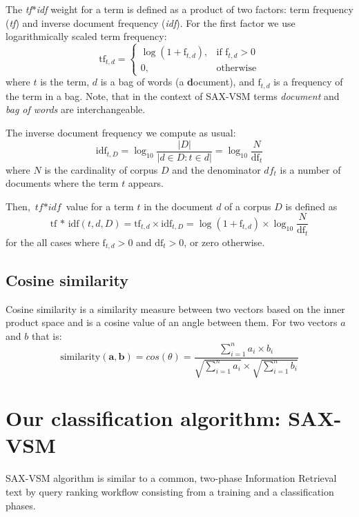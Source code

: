 \documentclass{llncs}
\begin{document}
The \textit{tf$\ast$idf} weight for a term is defined as a product of two factors: 
term frequency (\textit{tf}) and inverse document frequency (\textit{idf}). 
For the first factor we use logarithmically scaled term frequency:
\begin{equation}
 \mbox{tf}_{t, d} =  \begin{cases} \log(1 + \mbox{f}_{t,d}), &\mbox{if f}_{t,d}>0  \\
0, & \mbox{otherwise} \end{cases}
\end{equation} 
where $t$ is the term, $d$ is a bag of words (a \textbf{d}ocument), and $\mbox{f}_{t,d}$ 
is a frequency of the term in a bag. Note, that in the context of SAX-VSM terms 
\textit{document} and \textit{bag of words} are interchangeable.

The inverse document frequency we compute as usual:
\begin{equation}
 \mbox{idf}_{t, D} =  \log_{10}\frac{|D|}{|d \in D : t \in d|} = \log_{10}\frac{N}{\mbox{df}_{t}}
\end{equation} 
where $N$ is the cardinality of corpus $D$ and the denominator $df_{t}$ is a number of documents
where the term $t$ appears.

Then, $\textit{tf$\ast$idf}$ value for a term $t$ in the document $d$ of a corpus $D$ is defined as 
\begin{equation}
 \mbox{tf * idf}(t, d, D) =  \mbox{tf}_{t, d} \times \mbox{idf}_{t, D} = \log(1 + \mbox{f}_{t,d})
\times \log_{10}\frac{N}{\mbox{df}_{t}}
\end{equation} 
for the all cases where $\mbox{f}_{t,d}>0$ and $\mbox{df}_{t}>0$, or zero otherwise.

\subsection{Cosine similarity}
Cosine similarity is a similarity measure between two vectors based on the inner product space
and is a cosine value of an angle between them. For two vectors $a$ and $b$ that is:
\begin{equation}
 \mbox{similarity}(\boldsymbol{a},\boldsymbol{b}) = cos(\theta) = \frac{ \sum\limits^{n}_{i=1} a_{i}
\times b_{i} }{
\sqrt{\sum\limits^{n}_{i=1} a_{i}} \times \sqrt{\sum\limits^{n}_{i=1} b_{i}} }
\end{equation} 


\section{Our classification algorithm: SAX-VSM}
SAX-VSM algorithm is similar to a common, two-phase Information Retrieval text by query ranking
workflow consisting from a training and a classification phases. 
\end{document}
